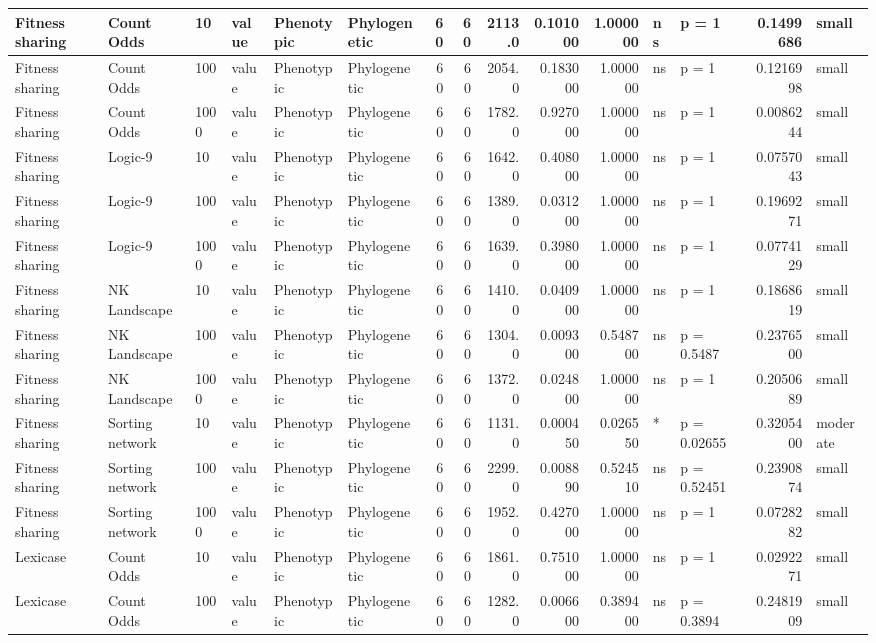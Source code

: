 \documentclass[]{book}
\begin{document}
\begin{table}
\begin{tabular}[t]{l|l|l|l|l|l|r|r|r|r|r|l|l|r|l}
\hline
Fitness sharing & Count Odds & 10 & value & Phenotypic & Phylogenetic & 60 & 60 & 2113.0 & 0.101000 & 1.000000 & ns & p = 1 & 0.1499686 & small\\
\hline
Fitness sharing & Count Odds & 100 & value & Phenotypic & Phylogenetic & 60 & 60 & 2054.0 & 0.183000 & 1.000000 & ns & p = 1 & 0.1216998 & small\\
\hline
Fitness sharing & Count Odds & 1000 & value & Phenotypic & Phylogenetic & 60 & 60 & 1782.0 & 0.927000 & 1.000000 & ns & p = 1 & 0.0086244 & small\\
\hline
Fitness sharing & Logic-9 & 10 & value & Phenotypic & Phylogenetic & 60 & 60 & 1642.0 & 0.408000 & 1.000000 & ns & p = 1 & 0.0757043 & small\\
\hline
Fitness sharing & Logic-9 & 100 & value & Phenotypic & Phylogenetic & 60 & 60 & 1389.0 & 0.031200 & 1.000000 & ns & p = 1 & 0.1969271 & small\\
\hline
Fitness sharing & Logic-9 & 1000 & value & Phenotypic & Phylogenetic & 60 & 60 & 1639.0 & 0.398000 & 1.000000 & ns & p = 1 & 0.0774129 & small\\
\hline
Fitness sharing & NK Landscape & 10 & value & Phenotypic & Phylogenetic & 60 & 60 & 1410.0 & 0.040900 & 1.000000 & ns & p = 1 & 0.1868619 & small\\
\hline
Fitness sharing & NK Landscape & 100 & value & Phenotypic & Phylogenetic & 60 & 60 & 1304.0 & 0.009300 & 0.548700 & ns & p = 0.5487 & 0.2376500 & small\\
\hline
Fitness sharing & NK Landscape & 1000 & value & Phenotypic & Phylogenetic & 60 & 60 & 1372.0 & 0.024800 & 1.000000 & ns & p = 1 & 0.2050689 & small\\
\hline
Fitness sharing & Sorting network & 10 & value & Phenotypic & Phylogenetic & 60 & 60 & 1131.0 & 0.000450 & 0.026550 & * & p = 0.02655 & 0.3205400 & moderate\\
\hline
Fitness sharing & Sorting network & 100 & value & Phenotypic & Phylogenetic & 60 & 60 & 2299.0 & 0.008890 & 0.524510 & ns & p = 0.52451 & 0.2390874 & small\\
\hline
Fitness sharing & Sorting network & 1000 & value & Phenotypic & Phylogenetic & 60 & 60 & 1952.0 & 0.427000 & 1.000000 & ns & p = 1 & 0.0728282 & small\\
\hline
Lexicase & Count Odds & 10 & value & Phenotypic & Phylogenetic & 60 & 60 & 1861.0 & 0.751000 & 1.000000 & ns & p = 1 & 0.0292271 & small\\
\hline
Lexicase & Count Odds & 100 & value & Phenotypic & Phylogenetic & 60 & 60 & 1282.0 & 0.006600 & 0.389400 & ns & p = 0.3894 & 0.2481909 & small\\

\end{tabular}
\end{table}
\end{document}
